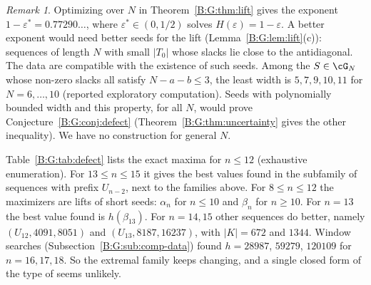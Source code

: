 \documentclass[11pt,a4paper]{article}
\theoremstyle{definition}
\theoremstyle{remark}
\newtheorem{remark}[theorem]{Remark}
\numberwithin{equation}{section}
\begin{document}
\begin{remark}\label{B:G:rem:entropy}
Optimizing over $N$ in Theorem~\ref{B:G:thm:lift} gives the exponent $1-\varepsilon^*=0.77290\ldots$,
where $\varepsilon^*\in(0,1/2)$ solves $H(\varepsilon)=1-\varepsilon$. A better exponent would need
better seeds for the lift (Lemma~\ref{B:G:lem:lift}(c)): sequences of length $N$ with small
$|T_0|$ whose slacks lie close to the antidiagonal. The data are compatible with the existence of such seeds. Among the
$S\in\cG_N$ whose non-zero slacks all satisfy $N-a-b\le3$, the least width is $5,7,9,10,11$ for
$N=6,\dots,10$ (reported exploratory computation). Seeds with polynomially bounded width and this property,
for all $N$, would prove Conjecture~\ref{B:G:conj:defect} (Theorem~\ref{B:G:thm:uncertainty} gives the other inequality). We have no
construction for general $N$.
\end{remark}

Table~\ref{B:G:tab:defect} lists the exact maxima for $n\le12$ (exhaustive enumeration). For
$13\le n\le15$ it gives the best values found in the subfamily of sequences with prefix $U_{n-2}$,
next to the families above. For $8\le n\le12$ the maximizers are lifts of short seeds: $\alpha_n$ for
$n\le10$ and $\beta_n$ for $n\ge10$. For $n=13$ the best value found is $h(\beta_{13})$. For $n=14,15$ other sequences do better, namely $(U_{12},4091,8051)$ and
$(U_{13},8187,16237)$, with $|K|=672$ and $1344$. Window searches (Subsection~\ref{B:G:sub:comp-data})
found $h=28987$, $59279$, $120109$ for $n=16,17,18$. So the extremal family keeps changing, and a
single closed form of the type of \cite[Cor.~36]{R003} seems unlikely.
\end{document}

